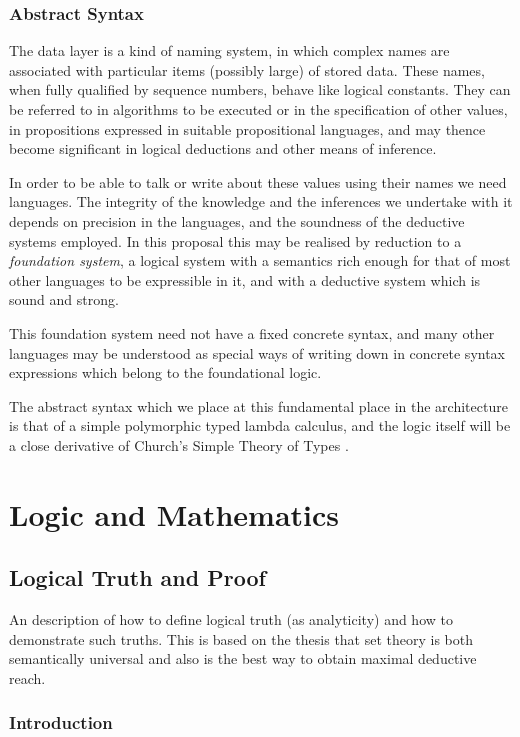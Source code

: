 \documentclass[10pt,titlepage]{book}
\begin{document}
\section{Abstract Syntax}

The data layer is a kind of naming system, in which complex names are associated with particular items (possibly large) of stored data.
These names, when fully qualified by sequence numbers, behave like logical constants.
They can be referred to in algorithms to be executed or in the specification of other values, in propositions expressed in suitable propositional languages, and may thence become significant in logical deductions and other means of inference.

In order to be able to talk or write about these values using their names we need languages.
The integrity of the knowledge and the inferences we undertake with it depends on precision in the languages, and the soundness of the deductive systems employed.
In this proposal this may be realised by reduction to a \emph{foundation system}, a logical system with a semantics rich enough for that of most other languages to be expressible in it, and with a deductive system which is sound and strong.

This foundation system need not have a fixed concrete syntax, and many other languages may be understood as special ways of writing down in concrete syntax expressions which belong to the foundational logic.

The abstract syntax which we place at this fundamental place in the architecture is that of a simple polymorphic typed lambda calculus, and the logic itself will be a close derivative of Church's Simple Theory of Types \cite{Church40}.

\part{Logic and Mathematics}

\chapter{Logical Truth and Proof}

An description of how to define logical truth (as analyticity) and how to demonstrate such truths.
This is based on the thesis that set theory is both semantically universal and also is the best way to obtain maximal deductive reach.


\section{Introduction}
\end{document}
